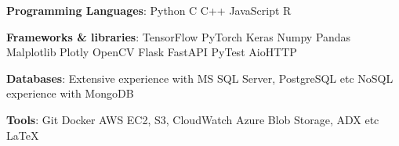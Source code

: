 \textbf{Programming Languages}: Python {\scalerel*{\cdot}{\bigodot}} C {\scalerel*{\cdot}{\bigodot}} C++ {\scalerel*{\cdot}{\bigodot}} JavaScript {\scalerel*{\cdot}{\bigodot}} R

\textbf{Frameworks & libraries}: TensorFlow {\scalerel*{\cdot}{\bigodot}} PyTorch {\scalerel*{\cdot}{\bigodot}} Keras {\scalerel*{\cdot}{\bigodot}} Numpy {\scalerel*{\cdot}{\bigodot}} Pandas {\scalerel*{\cdot}{\bigodot}} Malplotlib {\scalerel*{\cdot}{\bigodot}} Plotly {\scalerel*{\cdot}{\bigodot}}
OpenCV {\scalerel*{\cdot}{\bigodot}} Flask {\scalerel*{\cdot}{\bigodot}} FastAPI {\scalerel*{\cdot}{\bigodot}} PyTest {\scalerel*{\cdot}{\bigodot}} AioHTTP


\textbf{Databases}: Extensive experience with MS SQL Server, PostgreSQL etc {\scalerel*{\cdot}{\bigodot}} NoSQL experience with MongoDB

\textbf{Tools}: Git {\scalerel*{\cdot}{\bigodot}} Docker {\scalerel*{\cdot}{\bigodot}} AWS EC2, S3, CloudWatch {\scalerel*{\cdot}{\bigodot}} Azure Blob Storage, ADX etc {\scalerel*{\cdot}{\bigodot}} \LaTeX{}
